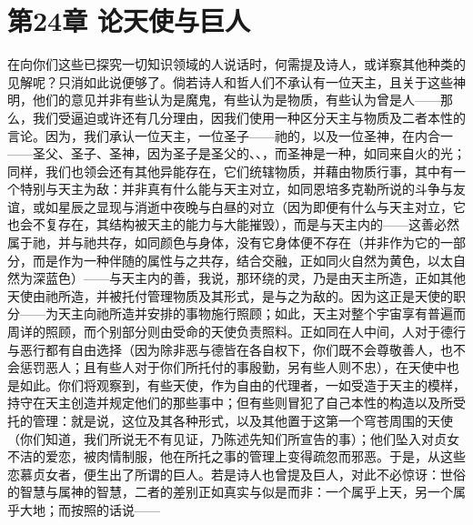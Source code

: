 
\section{第24章 论天使与巨人}

在向你们这些已探究一切知识领域的人说话时，何需提及诗人，或详察其他种类的见解呢？只消如此说便够了。倘若诗人和哲人们不承认有一位天主，且关于这些神明，他们的意见并非有些认为是魔鬼，有些认为是物质，有些认为曾是人——那么，我们受逼迫或许还有几分理由，因我们使用一种区分天主与物质及二者本性的言论。因为，我们承认一位天主，一位圣子——祂的，以及一位圣神，在内合一——圣父、圣子、圣神，因为圣子是圣父的、、，而圣神是一种，如同来自火的光；同样，我们也领会还有其他异能存在，它们统辖物质，并藉由物质行事，其中有一个特别与天主为敌：并非真有什么能与天主对立，如同恩培多克勒所说的斗争与友谊，或如星辰之显现与消逝中夜晚与白昼的对立（因为即便有什么与天主对立，它也会不复存在，其结构被天主的能力与大能摧毁），而是与天主内的——这善必然属于祂，并与祂共存，如同颜色与身体，没有它身体便不存在（并非作为它的一部分，而是作为一种伴随的属性与之共存，结合交融，正如同火自然为黄色，以太自然为深蓝色）——与天主内的善，我说，那环绕的灵，乃是由天主所造，正如其他天使由祂所造，并被托付管理物质及其形式，是与之为敌的。因为这正是天使的职分——为天主向祂所造并安排的事物施行照顾；如此，天主对整个宇宙享有普遍而周详的照顾，而个别部分则由受命的天使负责照料。正如同在人中间，人对于德行与恶行都有自由选择（因为除非恶与德皆在各自权下，你们既不会尊敬善人，也不会惩罚恶人；且有些人对于你们所托付的事殷勤，另有些人则不忠），在天使中也是如此。你们将观察到，有些天使，作为自由的代理者，一如受造于天主的模样，持守在天主创造并规定他们的那些事中；但有些则冒犯了自己本性的构造以及所受托的管理：就是说，这位及其各种形式，以及其他置于这第一个穹苍周围的天使（你们知道，我们所说无不有见证，乃陈述先知们所宣告的事）；他们坠入对贞女不洁的爱恋，被肉情制服，他在所托之事的管理上变得疏忽而邪恶。于是，从这些恋慕贞女者，便生出了所谓的巨人。若是诗人也曾提及巨人，对此不必惊讶：世俗的智慧与属神的智慧，二者的差别正如真实与似是而非：一个属乎上天，另一个属乎大地；而按照的话说——\par

\par

